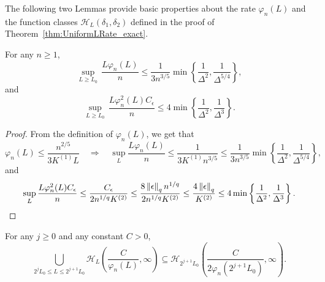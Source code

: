 The following two Lemmas provide basic properties about the rate $\varphi_n(L)$ and the function classes $\mathcal{H}_L(\delta_1, \delta_2)$ defined in the proof of Theorem~\ref{thm:UniformLRate_exact}.
\begin{lemma}\label{lem:PropertiesVarphi}
For any $n\ge 1$,
\begin{equation}\label{eq:qTermVarphi}
\sup_{L \ge L_0}\,\frac{L\varphi_n(L)}{n} \le \frac{1}{3n^{3/5}}\min\left\{\frac{1}{\Delta^2}, \frac{1}{\Delta^{5/4}}\right\}, 
\end{equation}
and
\begin{equation}\label{eq:ComplexityTermVarPhi}
\sup_{L \ge L_0}\,\frac{L\varphi_n^2(L)C_{\epsilon}}{n}\le 4\min\left\{\frac{1}{\Delta^2}, \frac{1}{\Delta^3}\right\}.
\end{equation}
\end{lemma}
\begin{proof}
From the definition of $\varphi_n(L)$, we get that
\begin{equation}
\varphi_n(L) \le \frac{n^{2/5}}{3K^{(1)}L}\quad\Rightarrow\quad \sup_{L}\frac{L\varphi_n(L)}{n} \le \frac{1}{3K^{(1)}n^{3/5}} \le \frac{1}{3n^{3/5}}\min\left\{\frac{1}{\Delta^2}, \frac{1}{\Delta^{5/4}}\right\},
\end{equation}
and
\[
\sup_L \frac{L\varphi_n^2(L)C_{\epsilon}}{n} \le \frac{C_{\epsilon}}{2n^{1/q}K^{(2)}} \le \frac{8\left\lVert\epsilon\right\rVert_qn^{1/q}}{2n^{1/q}K^{(2)}} \le \frac{4\left\lVert\epsilon\right\rVert_q}{K^{(2)}} \le 4\min\left\{\frac{1}{\Delta^2}, \frac{1}{\Delta^3}\right\}.
\]
\end{proof}
\begin{lemma}\label{lem:BigCupSingle}
For any $j \ge 0$ and any constant $C > 0$,
\[
\bigcup_{2^jL_0 \le L\le 2^{j+1}L_0}\mathcal{H}_L\left(\frac{C}{\varphi_n(L)}, \infty\right) \subseteq \mathcal{H}_{2^{j+1}L_0}\left(\frac{C}{2\varphi_n(2^{j+1}L_0)}, \infty\right).
\]
\end{lemma}
